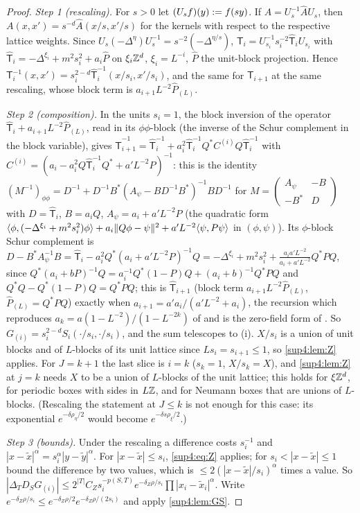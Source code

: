 \begin{proof}
\emph{Step 1 (rescaling).} For $s>0$ let $(U_sf)(y):= f(sy)$. If $A=U_s^{-1}\hat AU_s$, then $A(x,x')=s^{-d}\hat A(x/s,x'/s)$ for the kernels with respect to the respective lattice weights. Since $U_s(-\Delta^\eta)U_s^{-1}=s^{-2}(-\Delta^{\eta/s})$, $\mathsf T_i=U_{s_i}^{-1}s_i^{-2}\hat{\mathsf T}_iU_{s_i}$ with $\hat{\mathsf T}_i=-\Delta^{\xi_i}+m^2s_i^2+a_i\hat P$ on $\xi_i\mathbb Z^d$, $\xi_i=L^{-i}$, $\hat P$ the unit-block projection. Hence $\mathsf T_i^{-1}(x,x')=s_i^{2-d}\hat{\mathsf T}_i^{-1}(x/s_i,x'/s_i)$, and the same for $\mathsf T_{i+1}$ at the same rescaling, whose block term is $a_{i+1}L^{-2}\hat P_{(L)}$.

\emph{Step 2 (composition).} In the units $s_i=1$, the block inversion of the operator $\hat{\mathsf T}_i+a_{i+1}L^{-2}\hat P_{(L)}$, read in its $\phi\phi$-block (the inverse of the Schur complement in the block variable), gives $\hat{\mathsf T}_{i+1}^{-1}=\hat{\mathsf T}_i^{-1}+a_i^2\hat{\mathsf T}_i^{-1}Q^*C^{(i)}Q\hat{\mathsf T}_i^{-1}$ with $C^{(i)}=(a_i-a_i^2Q\hat{\mathsf T}_i^{-1}Q^*+a'L^{-2}P)^{-1}$: this is the identity $(M^{-1})_{\phi\phi}=D^{-1}+D^{-1}B^*(A_\psi-BD^{-1}B^*)^{-1}BD^{-1}$ for $M=\begin{pmatrix}A_\psi&-B\\-B^*&D\end{pmatrix}$ with $D=\hat{\mathsf T}_i$, $B=a_iQ$, $A_\psi=a_i+a'L^{-2}P$ (the quadratic form $\langle \phi,(-\Delta^{\xi_i}+m^2s_i^2)\phi\rangle+a_i\lVert Q\phi-\psi\rVert^2+a'L^{-2}\langle \psi,P\psi\rangle$ in $(\phi,\psi)$). Its $\phi$-block Schur complement is $D-B^*A_\psi^{-1}B=\hat{\mathsf T}_i-a_i^2Q^*(a_i+a'L^{-2}P)^{-1}Q=-\Delta^{\xi_i}+m^2s_i^2+\frac{a_ia'L^{-2}}{a_i+a'L^{-2}}Q^*PQ$, since $Q^*(a_i+bP)^{-1}Q=a_i^{-1}Q^*(1-P)Q+(a_i+b)^{-1}Q^*PQ$ and $Q^*Q-Q^*(1-P)Q=Q^*PQ$; this is $\hat{\mathsf T}_{i+1}$ (block term $a_{i+1}L^{-2}\hat P_{(L)}$, $\hat P_{(L)}=Q^*PQ$) exactly when $a_{i+1}=a'a_i/(a'L^{-2}+a_i)$, the recursion which reproduces $a_k=a(1-L^{-2})/(1-L^{-2k})$ of \cite[(2.15)]{Ba1} and is the zero-field form of \cite[(1.27)]{Ba3}. So $G_{(i)}=s_i^{2-d}S_i(\cdot/s_i,\cdot/s_i)$, and the sum telescopes to (i). $X/s_i$ is a union of unit blocks and of $L$-blocks of its unit lattice since $Ls_i=s_{i+1}\le1$, so \cref{sup4:lem:Z} applies. For $J=k+1$ the last slice is $i=k$ ($s_k=1$, $X/s_k=X$), and \cref{sup4:lem:Z} at $j=k$ needs $X$ to be a union of $L$-blocks of the unit lattice; this holds for $\xi\mathbb Z^d$, for periodic boxes with sides in $L\mathbb Z$, and for Neumann boxes that are unions of $L$-blocks. (Rescaling the statement at $J\le k$ is not enough for this case: its exponential $e^{-\delta\rho_\eta/2}$ would become $e^{-\delta s\rho_\xi/2}$.)

\emph{Step 3 (bounds).} Under the rescaling a difference costs $s_i^{-1}$ and $|x-\tilde x|^\alpha=s_i^\alpha|y-\tilde y|^\alpha$. For $|x-\tilde x|\le s_i$, \eqref{sup4:eq:Z} applies; for $s_i<|x-\tilde x|\le1$ bound the difference by two values, which is $\le2(|x-\tilde x|/s_i)^\alpha$ times a value. So $|\Delta_TD_SG_{(i)}|\le2^{|T|}C_Zs_i^{-p(S,T)}e^{-\delta_Z\rho/s_i}\prod|x_i-\tilde x_i|^\alpha$. Write $e^{-\delta_Z\rho/s_i}\le e^{-\delta_Z\rho/2}e^{-\delta_Z\rho/(2s_i)}$ and apply \cref{sup4:lem:GS}.
\end{proof}
